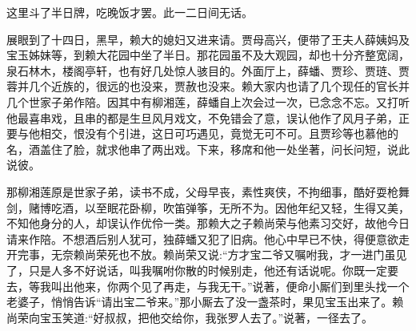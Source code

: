 \begin{parag}
    这里斗了半日牌，吃晚饭才罢。此一二日间无话。
\end{parag}


\begin{parag}
    展眼到了十四日，黑早，赖大的媳妇又进来请。贾母高兴，便带了王夫人薛姨妈及宝玉姊妹等，到赖大花园中坐了半日。那花园虽不及大观园，却也十分齐整宽阔，泉石林木，楼阁亭轩，也有好几处惊人骇目的。外面厅上，薛蟠、贾珍、贾琏、贾蓉并几个近族的，很远的也没来，贾赦也没来。赖大家内也请了几个现任的官长并几个世家子弟作陪。因其中有柳湘莲，薛蟠自上次会过一次，已念念不忘。又打听他最喜串戏，且串的都是生旦风月戏文，不免错会了意，误认他作了风月子弟，正要与他相交，恨没有个引进，这日可巧遇见，竟觉无可不可。且贾珍等也慕他的名，酒盖住了脸，就求他串了两出戏。下来，移席和他一处坐著，问长问短，说此说彼。
\end{parag}


\begin{parag}
    那柳湘莲原是世家子弟，读书不成，父母早丧，素性爽侠，不拘细事，酷好耍枪舞剑，赌博吃酒，以至眠花卧柳，吹笛弹筝，无所不为。因他年纪又轻，生得又美，不知他身分的人，却误认作优伶一类。那赖大之子赖尚荣与他素习交好，故他今日请来作陪。不想酒后别人犹可，独薛蟠又犯了旧病。他心中早已不快，得便意欲走开完事，无奈赖尚荣死也不放。赖尚荣又说:“方才宝二爷又嘱咐我，才一进门虽见了，只是人多不好说话，叫我嘱咐你散的时候别走，他还有话说呢。你既一定要去，等我叫出他来，你两个见了再走，与我无干。”说著，便命小厮们到里头找一个老婆子，悄悄告诉“请出宝二爷来。”那小厮去了没一盏茶时，果见宝玉出来了。赖尚荣向宝玉笑道:“好叔叔，把他交给你，我张罗人去了。”说著，一径去了。
\end{parag}


